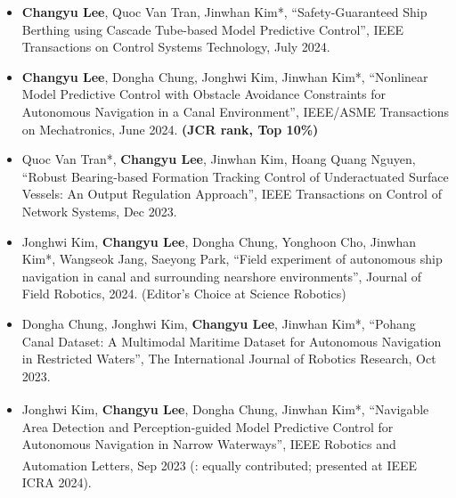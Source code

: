 \documentclass[10pt, letterpaper]{article}
\begin{document}
\begin{itemize}
            \vspace{0.2 cm}

            \item [\textbf{[J9]}] \textbf{Changyu Lee}, Quoc Van Tran, Jinwhan Kim*, “Safety-Guaranteed Ship Berthing using Cascade Tube-based Model Predictive Control”, \textcolor{NavyBlue}{IEEE Transactions on Control Systems Technology}, July 2024.

            \vspace{0.2 cm}

            \item [\textbf{[J8]}] \textbf{Changyu Lee}, Dongha Chung, Jonghwi Kim, Jinwhan Kim*, “Nonlinear Model Predictive Control with Obstacle Avoidance Constraints for Autonomous Navigation in a Canal Environment”, \textcolor{NavyBlue}{IEEE/ASME Transactions on Mechatronics}, June 2024. \textbf{(JCR rank, Top 10\%)}

            \vspace{0.2 cm}

            \item [\textbf{[J7]}] Quoc Van Tran*, \textbf{Changyu Lee}, Jinwhan Kim, Hoang Quang Nguyen, “Robust Bearing-based Formation Tracking Control of Underactuated Surface Vessels: An Output Regulation Approach”, \textcolor{NavyBlue}{IEEE Transactions on Control of Network Systems}, Dec 2023.

            \vspace{0.2 cm}

            \item [\textbf{[J6]}] Jonghwi Kim, \textbf{Changyu Lee}, Dongha Chung, Yonghoon Cho, Jinwhan Kim*, Wangseok Jang, Saeyong Park, “Field experiment of autonomous ship navigation in canal and surrounding nearshore environments”, \textcolor{NavyBlue}{Journal of Field Robotics}, 2024. (\textcolor{NavyBlue}{Editor's Choice at Science Robotics})

            \vspace{0.2 cm}

            \item [\textbf{[J5]}] Dongha Chung, Jonghwi Kim, \textbf{Changyu Lee}, Jinwhan Kim*, “Pohang Canal Dataset: A Multimodal Maritime Dataset for Autonomous Navigation in Restricted Waters”, \textcolor{NavyBlue}{The International Journal of Robotics Research}, Oct 2023.

            \vspace{0.2 cm}

             \item [\textbf{[J4]}] Jonghwi Kim\textsuperscript{\textdagger}, \textbf{Changyu Lee}\textsuperscript{\textdagger}, Dongha Chung, Jinwhan Kim*, “Navigable Area Detection and Perception-guided Model Predictive Control for Autonomous Navigation in Narrow Waterways”, \textcolor{NavyBlue}{IEEE Robotics and Automation Letters}, Sep 2023 (\textsuperscript{\textdagger}: equally contributed; presented at IEEE ICRA 2024).


\end{itemize}
\end{document}
